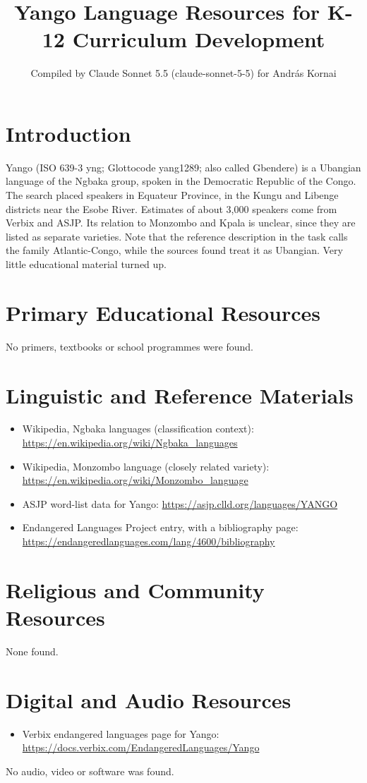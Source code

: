 \documentclass[12pt]{article}
\title{Yango Language Resources for K-12 Curriculum Development}
\author{Compiled by Claude Sonnet 5.5 (claude-sonnet-5-5) for Andr\'as Kornai}
\date{}
\begin{document}
\maketitle

\section{Introduction}
Yango (ISO 639-3 yng; Glottocode yang1289; also called Gbendere) is a Ubangian language of the Ngbaka group, spoken in the Democratic Republic of the Congo. The search placed speakers in Equateur Province, in the Kungu and Libenge districts near the Esobe River. Estimates of about 3,000 speakers come from Verbix and ASJP. Its relation to Monzombo and Kpala is unclear, since they are listed as separate varieties. Note that the reference description in the task calls the family Atlantic-Congo, while the sources found treat it as Ubangian. Very little educational material turned up.

\section{Primary Educational Resources}
No primers, textbooks or school programmes were found.

\section{Linguistic and Reference Materials}
\begin{itemize}
\item Wikipedia, Ngbaka languages (classification context): \url{https://en.wikipedia.org/wiki/Ngbaka_languages}
\item Wikipedia, Monzombo language (closely related variety): \url{https://en.wikipedia.org/wiki/Monzombo_language}
\item ASJP word-list data for Yango: \url{https://asjp.clld.org/languages/YANGO}
\item Endangered Languages Project entry, with a bibliography page: \url{https://endangeredlanguages.com/lang/4600/bibliography}
\end{itemize}

\section{Religious and Community Resources}
None found.

\section{Digital and Audio Resources}
\begin{itemize}
\item Verbix endangered languages page for Yango: \url{https://docs.verbix.com/EndangeredLanguages/Yango}
\end{itemize}
No audio, video or software was found.
\end{document}
